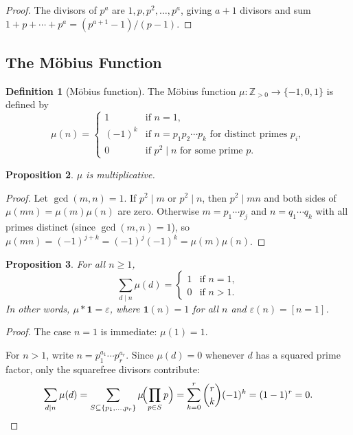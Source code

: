 \documentclass[12pt,a4paper,openany]{book}
\theoremstyle{definition}
\newtheorem{definition}{Definition}[chapter]
\theoremstyle{plain}
\newtheorem{proposition}[definition]{Proposition}
\theoremstyle{remark}
\newcommand{\Z}{\mathbb{Z}}
\begin{document}
\begin{proof}
The divisors of $p^a$ are $1, p, p^2, \ldots, p^a$, giving $a+1$ divisors
and sum $1 + p + \cdots + p^a = (p^{a+1}-1)/(p-1)$.
\end{proof}

\subsection{The M\"obius Function}\label{subsec:mobius}

\begin{definition}[M\"obius function]\label{def:mobius}
The M\"obius function $\mu \colon \Z_{>0} \to \{-1,0,1\}$
 is defined by
\[
  \mu(n) = \begin{cases}
    1       & \text{if } n = 1, \\
    (-1)^k  & \text{if } n = p_1 p_2 \cdots p_k \text{ for distinct primes } p_i, \\
    0       & \text{if } p^2 \mid n \text{ for some prime } p.
  \end{cases}
\]
\end{definition}

\begin{proposition}\label{prop:mu-mult}
$\mu$ is multiplicative.
\end{proposition}

\begin{proof}
Let $\gcd(m,n)=1$.  If $p^2 \mid m$ or $p^2 \mid n$, then $p^2 \mid mn$ and
both sides of $\mu(mn) = \mu(m)\mu(n)$ are zero.  Otherwise
$m = p_1\cdots p_j$ and $n = q_1 \cdots q_k$ with all primes distinct
(since $\gcd(m,n)=1$), so
$\mu(mn) = (-1)^{j+k} = (-1)^j(-1)^k = \mu(m)\mu(n)$.
\end{proof}

\begin{proposition}\label{prop:mu-sum}
For all $n \ge 1$,
\[
  \sum_{d \mid n} \mu(d) = \begin{cases} 1 & \text{if } n = 1,\\ 0 & \text{if } n > 1.\end{cases}
\]
In other words, $\mu \ast \mathbf{1} = \varepsilon$, where
$\mathbf{1}(n)=1$ for all $n$ and $\varepsilon(n) = [n=1]$.
\end{proposition}

\begin{proof}
The case $n=1$ is immediate: $\mu(1) = 1$.

For $n > 1$, write $n = p_1^{a_1}\cdots p_r^{a_r}$.  Since $\mu(d)=0$ whenever
$d$ has a squared prime factor, only the squarefree divisors contribute:
\[
  \sum_{d\mid n} \mu(d)
  = \sum_{S \subseteq \{p_1,\ldots,p_r\}} \mu\!\Bigl(\prod_{p\in S} p\Bigr)
  = \sum_{k=0}^{r} \binom{r}{k}(-1)^k
  = (1-1)^r = 0. \qedhere
\]
\end{proof}
\end{document}
